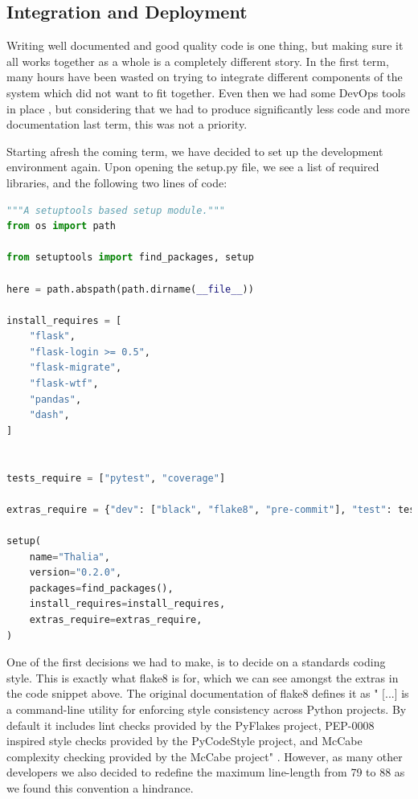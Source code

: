 \documentclass[main.tex]{subfiles}
\begin{document}
\subsection{Integration and Deployment}
\label{Coding Standards}

 Writing well documented and good quality code is one thing, but making sure it all works together as a whole is a completely different story. In the first term, many hours have been wasted on trying to integrate different components of the system which did not want to fit together. Even then we had some DevOps tools in place \cite{DevOps}, but considering that we had to produce significantly less code and more documentation last term, this was not a priority.

 Starting afresh the coming term, we have decided to set up the development environment again. Upon opening the setup.py file, we see a list of required libraries, and the following two lines of code:

\begin{lstlisting}[language=Python, caption=setup.py - Development environment, label=lst:Development_env]
"""A setuptools based setup module."""
from os import path

from setuptools import find_packages, setup

here = path.abspath(path.dirname(__file__))

install_requires = [
    "flask",
    "flask-login >= 0.5",
    "flask-migrate",
    "flask-wtf",
    "pandas",
    "dash",
]


tests_require = ["pytest", "coverage"]

extras_require = {"dev": ["black", "flake8", "pre-commit"], "test": tests_require}

setup(
    name="Thalia",
    version="0.2.0",
    packages=find_packages(),
    install_requires=install_requires,
    extras_require=extras_require,
)
\end{lstlisting}

One of the first decisions we had to make, is to decide on a standards coding style. This is exactly what flake8 is for, which we can see amongst the extras in the code snippet above. The original documentation of flake8 defines it as " [...] is a command-line utility for enforcing style consistency across Python projects. By default it includes lint checks provided by the PyFlakes project, PEP-0008 inspired style checks provided by the PyCodeStyle project, and McCabe complexity checking provided by the McCabe project" \cite{flake8}. However, as many other developers we also decided to redefine the maximum line-length from 79 to 88 as we found this convention a hindrance.
\end{document}
